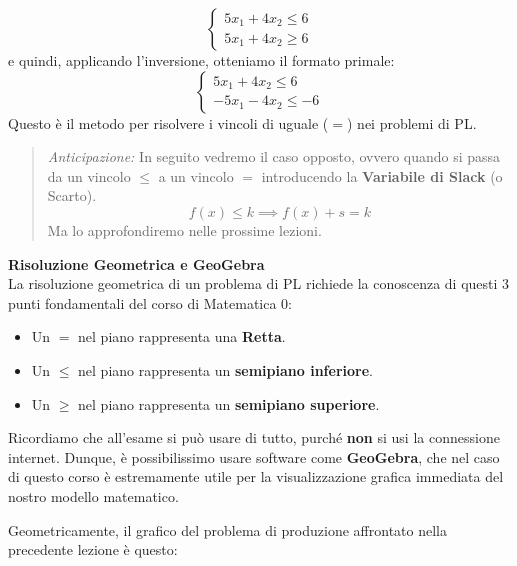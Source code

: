 \documentclass[12pt, a4paper]{article}
\begin{document}
	\[
	\begin{cases}
		5x_1 + 4x_2 \leq 6 \\
		5x_1 + 4x_2 \geq 6
	\end{cases}
	\]
	e quindi, applicando l'inversione, otteniamo il formato primale:
	\[
	\begin{cases}
		5x_1 + 4x_2 \leq 6 \\
		-5x_1 - 4x_2 \leq -6
	\end{cases}
	\]
	Questo è il metodo per risolvere i vincoli di uguale ($=$) nei problemi di PL.
	
	\begin{quote}
		\textit{Anticipazione:} In seguito vedremo il caso opposto, ovvero quando si passa da un vincolo $\leq$ a un vincolo $=$ introducendo la \textbf{Variabile di Slack} (o Scarto). 
		\[ f(x) \leq k \implies f(x) + s = k \]
		Ma lo approfondiremo nelle prossime lezioni.
	\end{quote}
	
	\vspace{0.4cm}
	\textbf{Risoluzione Geometrica e GeoGebra}\\
	La risoluzione geometrica di un problema di PL richiede la conoscenza di questi 3 punti fondamentali del corso di Matematica 0:
	\begin{itemize}[label=\textcolor{titlecolor}{\Large\textbullet}, itemsep=2pt, leftmargin=1.5cm]
		\item Un $=$ nel piano rappresenta una \textbf{Retta}.
		\item Un $\leq$ nel piano rappresenta un \textbf{semipiano inferiore}.
		\item Un $\geq$ nel piano rappresenta un \textbf{semipiano superiore}.
	\end{itemize}
	
	Ricordiamo che all'esame si può usare di tutto, purché \textbf{non} si usi la connessione internet. Dunque, è possibilissimo usare software come \textbf{GeoGebra}, che nel caso di questo corso è estremamente utile per la visualizzazione grafica immediata del nostro modello matematico.
	
	Geometricamente, il grafico del problema di produzione affrontato nella precedente lezione è questo:
	
\end{document}
